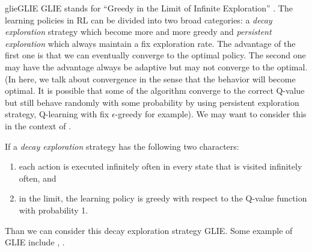 \documentclass[9pt]{article}
\begin{document}
\begin{topic}{glie}{GLIE}
GLIE stands for ``Greedy in the Limit of Infinite Exploration'' \citep{singh2000convergence}. The learning policies in RL can be divided into two broad categories: a \textit{decay exploration} strategy which become more and more greedy and \textit{persistent exploration} which always maintain a fix exploration rate. The advantage of the first one is that we can eventually converge to the optimal policy. The second one may have the advantage always be adaptive but may not converge to the optimal. (In here, we talk about convergence in the sense that the behavior will become optimal. It is possible that some of the algorithm converge to the correct Q-value but still behave randomly with some probability by using persistent exploration strategy, Q-learning with fix $\epsilon$-greedy for example). We may want to consider this in the context of .

If a \textit{decay exploration} strategy has the following two characters:
\begin{enumerate}
\item each action is executed infinitely often in every state that is visited infinitely often, and
\item in the limit, the learning policy is greedy with respect to the Q-value function with probability 1.
\end{enumerate}
Than we can consider this decay exploration strategy GLIE. Some example of GLIE include , .
\end{topic}
\end{document}
